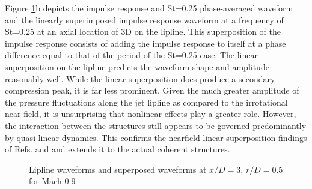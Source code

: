 \documentclass[english]{aiaa-tc}
\begin{document}
Figure \ref{NUM_Phase_AVG_lip}b depicts the impulse response and St=0.25 phase-averaged waveform and the linearly superimposed impulse response waveform at a frequency of St=0.25 at an axial location of 3D on the lipline. This superposition of the impulse response consists of adding the impulse response to itself at a phase difference equal to that of the period of the St=0.25 case.
The linear superposition on the lipline predicts the waveform shape and amplitude reasonably well.
While the linear superposition does produce a secondary compression peak, it is far less prominent. Given the much greater amplitude of the pressure fluctuations along the jet lipline as compared to the irrotational near-field, it is unsurprising that nonlinear effects play a greater role. However, the interaction between the structures still appears to be governed predominantly by quasi-linear dynamics. This confirms the nearfield linear superposition findings of Refs. \cite{sinha2013} and \cite{Crawley2014} and extends it to the actual coherent structures.
\begin{figure}
	\centering{}\caption{Lipline waveforms and superposed waveforms at $x/D = 3$, $r/D = 0.5$ for Mach 0.9}\label{NUM_Phase_AVG_lip}
\end{figure}
\end{document}
